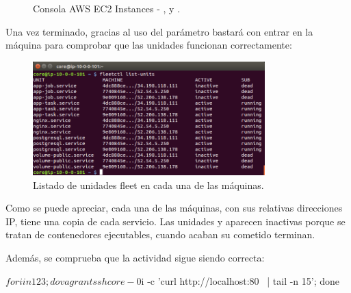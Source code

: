 \begin{figure}[H]
\caption{Consola AWS EC2 Instances - ,  y .\label{fig:figure_placement_example}}
\end{figure}

Una vez terminado, gracias al uso del parámetro  bastará con entrar en la máquina  para comprobar que las unidades funcionan correctamente:


\begin{figure}[H]
\centering
\includegraphics[width=0.8\textwidth]{images/figures/fleetctl-list-units.png}
\caption{Listado de unidades fleet en cada una de las máquinas.\label{fig:figure_placement_example}}
\end{figure}

Como se puede apreciar, cada una de las máquinas, con sus relativas direcciones IP, tiene una copia de cada servicio. Las unidades  y  aparecen inactivas porque se tratan de contenedores ejecutables, cuando acaban su cometido terminan.

Además, se comprueba que la actividad sigue siendo correcta:

\begin{code}
$ for i in 1 2 3; do vagrant ssh core-0$i -c 'curl http://localhost:80 \
  | tail -n 15'; done
\end{code}

